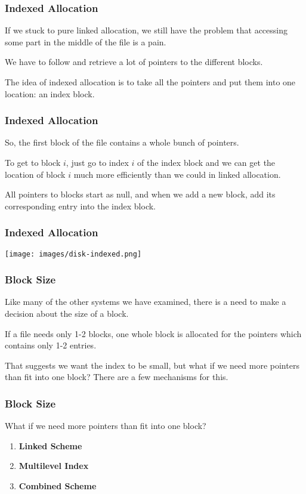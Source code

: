 \begin{frame}
\frametitle{Indexed Allocation}

If we stuck to pure linked allocation, we still have the problem that accessing some part in the middle of the file is a pain.

We have to follow and retrieve a lot of pointers to the different blocks. 

The idea of indexed allocation is to take all the pointers and put them into one location: an index block. 


\end{frame}



\begin{frame}
\frametitle{Indexed Allocation}

So, the first block of the file contains a whole bunch of pointers. 

To get to block $i$, just go to index $i$ of the index block and we can get the location of block $i$ much more efficiently than we could in linked allocation. 

All pointers to blocks start as null, and when we add a new block, add its corresponding entry into the index block.

\end{frame}

\begin{frame}
\frametitle{Indexed Allocation}

\begin{center}
	\texttt{[image: images/disk-indexed.png]}
\end{center}


\end{frame}

\begin{frame}
\frametitle{Block Size}

Like many of the other systems we have examined, there is a need to make a decision about the size of a block. 

If a file needs only 1-2 blocks, one whole block is allocated for the pointers which contains only 1-2 entries. 

That suggests we want the index to be small, but what if we need more pointers than fit into one block? There are a few mechanisms for this.


\end{frame}

\begin{frame}
\frametitle{Block Size}

What if we need more pointers than fit into one block?

\begin{enumerate}
	\item \textbf{Linked Scheme}
	\item \textbf{Multilevel Index}
	\item \textbf{Combined Scheme}
\end{enumerate}


\end{frame}

